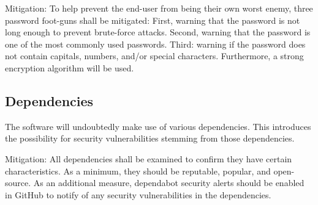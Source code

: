 \documentclass[12pt, letterpaper]{article}
\begin{document}
Mitigation: To help prevent the end-user from being their own worst enemy, three password foot-guns shall be mitigated: First, warning that the password is not long enough to prevent brute-force attacks. Second, warning that the password is one of the most commonly used passwords. Third: warning if the password does not contain capitals, numbers, and/or special characters. Furthermore, a strong encryption algorithm will be used.

\subsection{Dependencies}

The software will undoubtedly make use of various dependencies. This introduces the possibility for security vulnerabilities stemming from those dependencies.

Mitigation: All dependencies shall be examined to confirm they have certain characteristics. As a minimum, they should be reputable, popular, and open-source. As an additional measure, dependabot security alerts should be enabled in GitHub to notify of any security vulnerabilities in the dependencies.
\end{document}
